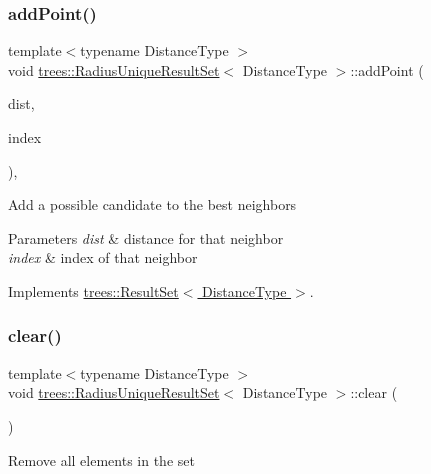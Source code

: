 \subsubsection{\texorpdfstring{add\+Point()}{addPoint()}}
{\footnotesize\ttfamily template$<$typename Distance\+Type $>$ \\
void \hyperlink{classtrees_1_1_radius_unique_result_set}{trees\+::\+Radius\+Unique\+Result\+Set}$<$ Distance\+Type $>$\+::add\+Point (\begin{DoxyParamCaption}\item[{Distance\+Type}]{dist,  }\item[{size\+\_\+t}]{index }\end{DoxyParamCaption})\hspace{0.3cm}{\ttfamily [inline]}, {\ttfamily [virtual]}}

Add a possible candidate to the best neighbors 
\begin{DoxyParams}{Parameters}
{\em dist} & distance for that neighbor \\
\hline
{\em index} & index of that neighbor \\
\hline
\end{DoxyParams}


Implements \hyperlink{classtrees_1_1_result_set}{trees\+::\+Result\+Set$<$ Distance\+Type $>$}.

\mbox{\label{classtrees_1_1_radius_unique_result_set_a1931c3241af134573cb3021f735c469c}} 
\subsubsection{\texorpdfstring{clear()}{clear()}}
{\footnotesize\ttfamily template$<$typename Distance\+Type $>$ \\
void \hyperlink{classtrees_1_1_radius_unique_result_set}{trees\+::\+Radius\+Unique\+Result\+Set}$<$ Distance\+Type $>$\+::clear (\begin{DoxyParamCaption}{ }\end{DoxyParamCaption})\hspace{0.3cm}{\ttfamily [inline]}}

Remove all elements in the set \mbox{\label{classtrees_1_1_radius_unique_result_set_a0a402d8fb16cfaa233d43bdcb5b3ab97}} 
